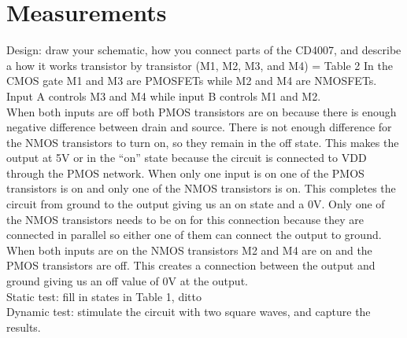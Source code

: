 \documentclass[9pt,a4paper]{report}
\newcommand*{\nsection}[1]{%
	\section*{#1}%
	\addcontentsline{toc}{section}{#1}}
\begin{document}
\nsection{Measurements}
Design: draw your schematic, how you connect parts of the CD4007, and describe a how it works transistor by transistor (M1, M2, M3, and M4) = Table 2 
In the CMOS gate M1 and M3 are PMOSFETs while M2 and M4 are NMOSFETs. Input A controls M3 and M4 while input B controls M1 and M2.\\
When both inputs are off both PMOS transistors are on because there is enough negative difference between drain and source. There is not enough difference for the NMOS transistors to turn on, so they remain in the off state. This makes the output at 5V or in the “on” state because the circuit is connected to VDD through the PMOS network.
When only one input is on one of the PMOS transistors is on and only one of the NMOS transistors is on. This completes the circuit from ground to the output giving us an on state and a 0V. Only one of the NMOS transistors needs to be on for this connection because they are connected in parallel so either one of them can connect the output to ground.\\
When both inputs are on the NMOS transistors M2 and M4 are on and the PMOS transistors are off.  This creates a connection between the output and ground giving us an off value of 0V at the output. \\

Static test: fill in states in Table 1, ditto \\
Dynamic test: stimulate the circuit with two square waves, and capture the results.
\end{document}
